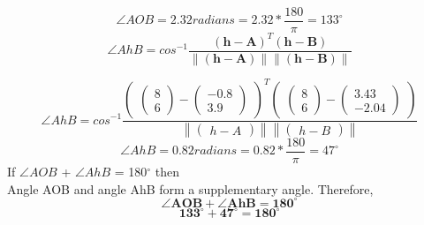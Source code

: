 \documentclass[journal,10pt,twocolumn]{article}
\providecommand{\norm}[1]{\left\lVert#1\right\rVert}
\let\vec\mathbf
\newcommand{\myvec}[1]{\ensuremath{\begin{pmatrix}#1\end{pmatrix}}}
\begin{document}
\begin{equation}
	\angle AOB = 2.32 radians = 2.32*\frac{180}{\pi} = 133^\circ
\end{equation}
\begin{equation}
	\angle AhB = cos^{-1}\frac{(\vec{h}-\vec{A})^T(\vec{h}-\vec{B})}{\norm{(\vec{h}-\vec{A})}\norm{(\vec{h}-\vec{B})}}
\end{equation}

\begin{equation}
	\angle AhB = cos^{-1}\frac{\myvec{\myvec{8\\6}-\myvec{-0.8\\3.9}}^T \myvec{\myvec{8\\6} - \myvec{3.43\\-2.04}}}{\norm{\myvec{h-A}} \norm{\myvec{h-B}}}
\end{equation}
\begin{equation}
	\angle AhB = 0.82 radians = 0.82*\frac{180}{\pi} = 47^\circ
\end{equation}
If $\angle AOB$ + $\angle AhB$ = 180$^\circ$ then \\
Angle AOB and angle AhB form a supplementary angle.
Therefore,
\begin{equation}
	\boldsymbol{\angle AOB + \angle AhB = 180^\circ}
\end{equation}
\begin{equation}
	\boldsymbol{133^\circ + 47^\circ = 180^\circ}
\end{equation}
\end{document}
